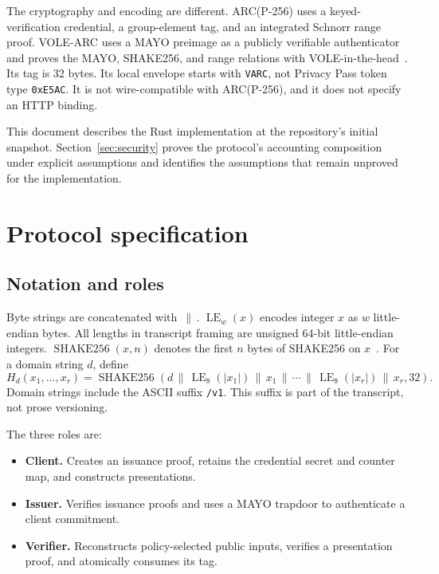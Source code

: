 \documentclass[11pt]{article}
\newcommand{\concat}{\,\|\,}
\newcommand{\LE}[1]{\operatorname{LE}_{#1}}
\newcommand{\XOF}{\operatorname{SHAKE256}}
\newcommand{\domain}[1]{\texttt{#1}}
\theoremstyle{remark}
\begin{document}
The cryptography and encoding are different. ARC(P-256) uses a
keyed-verification credential, a group-element tag, and an integrated Schnorr
range proof. VOLE-ARC uses a MAYO preimage as a publicly verifiable
authenticator and proves the MAYO, SHAKE256, and range relations with
VOLE-in-the-head~\cite{mayo-round2,vole-in-the-head}. Its tag is 32 bytes.
Its local envelope starts with \domain{VARC}, not Privacy Pass token type
\domain{0xE5AC}. It is not wire-compatible with ARC(P-256), and it does not
specify an HTTP binding.

This document describes the Rust implementation at the repository's initial
snapshot. Section~\ref{sec:security} proves the protocol's accounting
composition under explicit assumptions and identifies the assumptions that
remain unproved for the implementation.

\section{Protocol specification}
\label{sec:protocol}

\subsection{Notation and roles}

Byte strings are concatenated with $\concat$. $\LE{w}(x)$ encodes integer
$x$ as $w$ little-endian bytes. All lengths in transcript framing are
unsigned 64-bit little-endian integers. $\XOF(x,n)$ denotes the first $n$
bytes of SHAKE256 on $x$~\cite{fips-202}. For a domain string $d$, define
\[
  H_d(x_1,\ldots,x_r) =
  \XOF\!\left(d \concat
    \LE{8}(|x_1|) \concat x_1 \concat \cdots \concat
    \LE{8}(|x_r|) \concat x_r, 32\right).
\]
Domain strings include the ASCII suffix \domain{/v1}. This suffix is part of
the transcript, not prose versioning.

The three roles are:

\begin{itemize}
  \item \textbf{Client.} Creates an issuance proof, retains the credential
        secret and
        counter map, and constructs presentations.
  \item \textbf{Issuer.} Verifies issuance proofs and uses a MAYO trapdoor to
        authenticate a client commitment.
  \item \textbf{Verifier.} Reconstructs policy-selected public inputs,
        verifies a
        presentation proof, and atomically consumes its tag.
\end{itemize}
\end{document}
